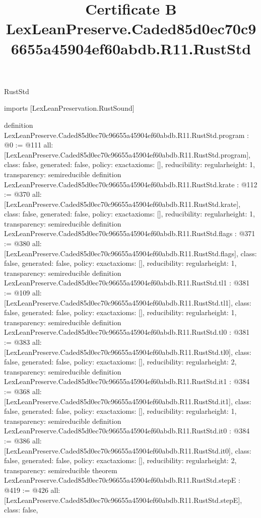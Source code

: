 \begin{lexlean}{RustStd}
\title{Certificate B LexLeanPreserve.Caded85d0ec70c96655a45904ef60abdb.R11.RustStd}
\begin{coremodule}
imports [LexLeanPreservation.RustSound]

definition LexLeanPreserve.Caded85d0ec70c96655a45904ef60abdb.R11.RustStd.program : @0 := @111 {
  all: [LexLeanPreserve.Caded85d0ec70c96655a45904ef60abdb.R11.RustStd.program],
  class: false,
  generated: false,
  policy: exact{axioms: []},
  reducibility: regular{height: 1},
  transparency: semireducible
}
definition LexLeanPreserve.Caded85d0ec70c96655a45904ef60abdb.R11.RustStd.krate : @112 := @370 {
  all: [LexLeanPreserve.Caded85d0ec70c96655a45904ef60abdb.R11.RustStd.krate],
  class: false,
  generated: false,
  policy: exact{axioms: []},
  reducibility: regular{height: 1},
  transparency: semireducible
}
definition LexLeanPreserve.Caded85d0ec70c96655a45904ef60abdb.R11.RustStd.flags : @371 := @380 {
  all: [LexLeanPreserve.Caded85d0ec70c96655a45904ef60abdb.R11.RustStd.flags],
  class: false,
  generated: false,
  policy: exact{axioms: []},
  reducibility: regular{height: 1},
  transparency: semireducible
}
definition LexLeanPreserve.Caded85d0ec70c96655a45904ef60abdb.R11.RustStd.tl1 : @381 := @109 {
  all: [LexLeanPreserve.Caded85d0ec70c96655a45904ef60abdb.R11.RustStd.tl1],
  class: false,
  generated: false,
  policy: exact{axioms: []},
  reducibility: regular{height: 1},
  transparency: semireducible
}
definition LexLeanPreserve.Caded85d0ec70c96655a45904ef60abdb.R11.RustStd.tl0 : @381 := @383 {
  all: [LexLeanPreserve.Caded85d0ec70c96655a45904ef60abdb.R11.RustStd.tl0],
  class: false,
  generated: false,
  policy: exact{axioms: []},
  reducibility: regular{height: 2},
  transparency: semireducible
}
definition LexLeanPreserve.Caded85d0ec70c96655a45904ef60abdb.R11.RustStd.it1 : @384 := @368 {
  all: [LexLeanPreserve.Caded85d0ec70c96655a45904ef60abdb.R11.RustStd.it1],
  class: false,
  generated: false,
  policy: exact{axioms: []},
  reducibility: regular{height: 1},
  transparency: semireducible
}
definition LexLeanPreserve.Caded85d0ec70c96655a45904ef60abdb.R11.RustStd.it0 : @384 := @386 {
  all: [LexLeanPreserve.Caded85d0ec70c96655a45904ef60abdb.R11.RustStd.it0],
  class: false,
  generated: false,
  policy: exact{axioms: []},
  reducibility: regular{height: 2},
  transparency: semireducible
}
theorem LexLeanPreserve.Caded85d0ec70c96655a45904ef60abdb.R11.RustStd.stepE : @419 := @426 {
  all: [LexLeanPreserve.Caded85d0ec70c96655a45904ef60abdb.R11.RustStd.stepE],
  class: false,
}
\end{coremodule}
\end{lexlean}
